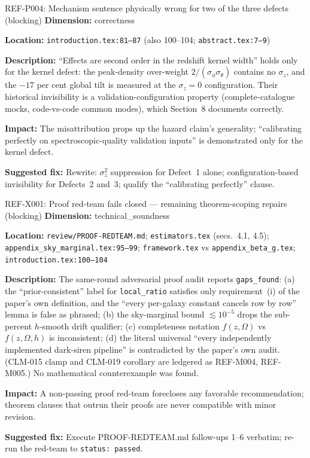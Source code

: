 \documentclass[11pt]{article}
\begin{document}
\begin{MajorIssueBox}{REF-P004: Mechanism sentence physically wrong for two of the three defects (blocking)}
\textbf{Dimension:} correctness

\textbf{Location:} \texttt{introduction.tex:81--87} (also 100--104; \texttt{abstract.tex:7--9})

\textbf{Description:} ``Effects are second order in the redshift kernel width'' holds only for the kernel defect: the peak-density over-weight $2/(\sigma_\phi \sigma_\theta)$ contains no $\sigma_z$, and the $-17$ per cent global tilt is measured at the $\sigma_z = 0$ configuration. Their historical invisibility is a validation-configuration property (complete-catalogue mocks, code-vs-code common modes), which Section~8 documents correctly.

\textbf{Impact:} The misattribution props up the hazard claim's generality; ``calibrating perfectly on spectroscopic-quality validation inputs'' is demonstrated only for the kernel defect.

\textbf{Suggested fix:} Rewrite: $\sigma_z^2$ suppression for Defect~1 alone; configuration-based invisibility for Defects~2 and~3; qualify the ``calibrating perfectly'' clause.
\end{MajorIssueBox}

\begin{MajorIssueBox}{REF-X001: Proof red-team fails closed --- remaining theorem-scoping repairs (blocking)}
\textbf{Dimension:} technical\_soundness

\textbf{Location:} \texttt{review/PROOF-REDTEAM.md}; \texttt{estimators.tex} (secs.~4.1, 4.5); \texttt{appendix\_sky\_marginal.tex:95--99}; \texttt{framework.tex} vs \texttt{appendix\_beta\_g.tex}; \texttt{introduction.tex:100--104}

\textbf{Description:} The same-round adversarial proof audit reports \texttt{gaps\_found}: (a) the ``prior-consistent'' label for \texttt{local\_ratio} satisfies only requirement~(i) of the paper's own definition, and the ``every per-galaxy constant cancels row by row'' lemma is false as phrased; (b) the sky-marginal bound $\lesssim 10^{-5}$ drops the sub-percent $h$-smooth drift qualifier; (c) completeness notation $f(z,\Omega)$ vs $f(z,\Omega,h)$ is inconsistent; (d) the literal universal ``every independently implemented dark-siren pipeline'' is contradicted by the paper's own audit. (CLM-015 clamp and CLM-019 corollary are ledgered as REF-M004, REF-M005.) No mathematical counterexample was found.

\textbf{Impact:} A non-passing proof red-team forecloses any favorable recommendation; theorem clauses that outrun their proofs are never compatible with minor revision.

\textbf{Suggested fix:} Execute PROOF-REDTEAM.md follow-ups 1--6 verbatim; re-run the red-team to \texttt{status: passed}.
\end{MajorIssueBox}
\end{document}
